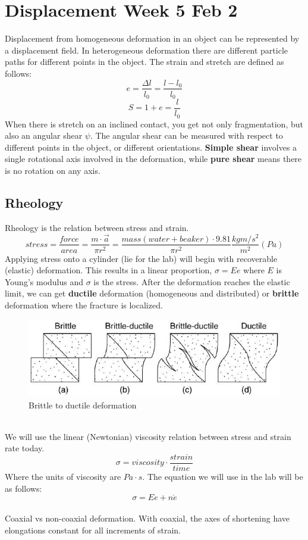 \documentclass[12pt,a4paper]{report}
\begin{document}
\section*{Displacement Week 5 Feb 2}
Displacement from homogeneous deformation in an object can be represented by a displacement field.
In heterogeneous deformation there are different particle paths for different points in the object.
The strain and stretch are defined as follows:
$$ e = \frac{\Delta l}{l_0} = \frac{l - l_0}{l_0} $$
$$ S = 1 + e = \frac{l}{l_0} $$
When there is stretch on an inclined contact, you get not only fragmentation, but also an angular shear $\psi$.
The angular shear can be measured with respect to different points in the object, or different orientations.
\textbf{Simple shear} involves a single rotational axis involved in the deformation, while \textbf{pure shear} means there is no rotation on any axis.
\subsection*{Rheology}
Rheology is the relation between stress and strain.
$$ stress = \frac{force}{area} = \frac{m \cdot \vec{a}}{\pi r^2} = \frac{mass(water + beaker) \cdot 9.81}{\pi r^2} \frac{kg m/s^2}{m^2} (Pa)$$
Applying stress onto a cylinder (lie for the lab) will begin with recoverable (elastic) deformation.
This results in a linear proportion, $ \sigma = Ee $ where $E$ is Young's modulus and $\sigma$ is the stress.
After the deformation reaches the elastic limit, we can get \textbf{ductile} deformation (homogeneous and distributed) or \textbf{brittle} deformation where the fracture is localized.
\begin{figure}[h]
  \includegraphics[scale=0.50]{brittle-to-ductile-deformation.png}
  \centering
  \caption{Brittle to ductile deformation}
\end{figure}
\\
We will use the linear (Newtonian) viscosity relation between stress and strain rate today.
$$ \sigma = viscosity \cdot \frac{strain}{time} $$
Where the units of viscosity are $Pa \cdot s$.
The equation we will use in the lab will be as follows:
$$ \sigma = Ee + n\mathring{e} $$
\\
Coaxial vs non-coaxial deformation. With coaxial, the axes of shortening have elongations constant for all increments of strain.
\end{document}
